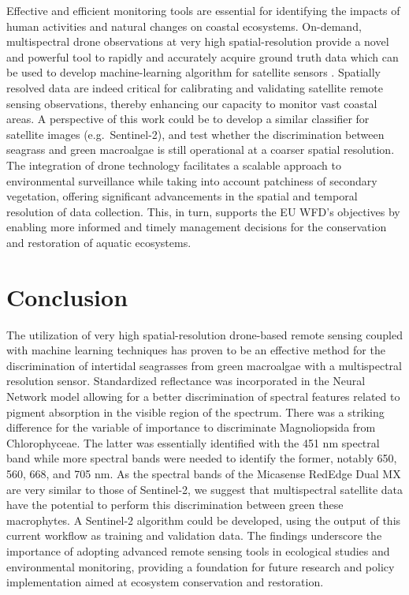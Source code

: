 \documentclass[
  number]{elsarticle}
\begin{document}
Effective and efficient monitoring tools are essential for identifying
the impacts of human activities and natural changes on coastal
ecosystems. On-demand, multispectral drone observations at very high
spatial-resolution provide a novel and powerful tool to rapidly and
accurately acquire ground truth data which can be used to develop
machine-learning algorithm for satellite sensors
\citep{davies2024intertidal}. Spatially resolved data are indeed
critical for calibrating and validating satellite remote sensing
observations, thereby enhancing our capacity to monitor vast coastal
areas. A perspective of this work could be to develop a similar
classifier for satellite images (e.g.~Sentinel-2), and test whether the
discrimination between seagrass and green macroalgae is still
operational at a coarser spatial resolution. The integration of drone
technology facilitates a scalable approach to environmental surveillance
while taking into account patchiness of secondary vegetation, offering
significant advancements in the spatial and temporal resolution of data
collection. This, in turn, supports the EU WFD's objectives by enabling
more informed and timely management decisions for the conservation and
restoration of aquatic ecosystems.

\section{Conclusion}\label{conclusion}

The utilization of very high spatial-resolution drone-based remote
sensing coupled with machine learning techniques has proven to be an
effective method for the discrimination of intertidal seagrasses from
green macroalgae with a multispectral resolution sensor. Standardized
reflectance was incorporated in the Neural Network model allowing for a
better discrimination of spectral features related to pigment absorption
in the visible region of the spectrum. There was a striking difference
for the variable of importance to discriminate Magnoliopsida from
Chlorophyceae. The latter was essentially identified with the 451 nm
spectral band while more spectral bands were needed to identify the
former, notably 650, 560, 668, and 705 nm. As the spectral bands of the
Micasense RedEdge Dual MX are very similar to those of Sentinel-2, we
suggest that multispectral satellite data have the potential to perform
this discrimination between green these macrophytes. A Sentinel-2
algorithm could be developed, using the output of this current workflow
as training and validation data. The findings underscore the importance
of adopting advanced remote sensing tools in ecological studies and
environmental monitoring, providing a foundation for future research and
policy implementation aimed at ecosystem conservation and restoration.


  
\end{document}
